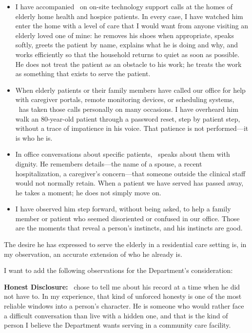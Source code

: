 \begin{itemize}[leftmargin=2em, itemsep=0.2em]
  \item I have accompanied \ApplicantName\ on on-site technology support calls at the homes of elderly home health and hospice patients. In every case, I have watched him enter the home with a level of care that I would want from anyone visiting an elderly loved one of mine: he removes his shoes when appropriate, speaks softly, greets the patient by name, explains what he is doing and why, and works efficiently so that the household returns to quiet as soon as possible. He does not treat the patient as an obstacle to his work; he treats the work as something that exists to serve the patient.
  \item When elderly patients or their family members have called our office for help with caregiver portals, remote monitoring devices, or scheduling systems, \ApplicantName\ has taken those calls personally on many occasions. I have overheard him walk an 80-year-old patient through a password reset, step by patient step, without a trace of impatience in his voice. That patience is not performed---it is who he is.
  \item In office conversations about specific patients, \ApplicantName\ speaks about them with dignity. He remembers details---the name of a spouse, a recent hospitalization, a caregiver's concern---that someone outside the clinical staff would not normally retain. When a patient we have served has passed away, he takes a moment; he does not simply move on.
  \item I have observed him step forward, without being asked, to help a family member or patient who seemed disoriented or confused in our office. Those are the moments that reveal a person's instincts, and his instincts are good.
\end{itemize}

The desire he has expressed to serve the elderly in a residential care setting is, in my observation, an accurate extension of who he already is.


I want to add the following observations for the Department's consideration:

\textbf{Honest Disclosure:} \ApplicantName\ chose to tell me about his record at a time when he did not have to. In my experience, that kind of unforced honesty is one of the most reliable windows into a person's character. He is someone who would rather face a difficult conversation than live with a hidden one, and that is the kind of person I believe the Department wants serving in a community care facility.

